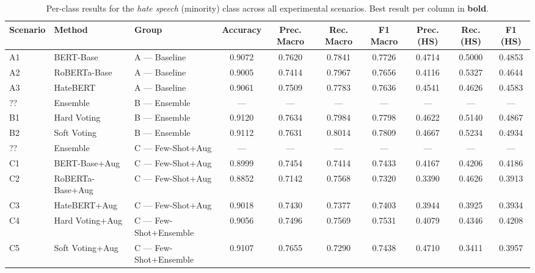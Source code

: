 \begin{table}[htbp]
\centering
\caption{Per-class results for the \emph{hate speech} (minority) class across all experimental scenarios. Best result per column in \textbf{bold}.}
\label{tab:hatespeech_results}
\small
\setlength{\tabcolsep}{4pt}
\renewcommand{\arraystretch}{1.2}
\begin{tabular}{lllccccccc}
\toprule
\textbf{Scenario} & \textbf{Method} & \textbf{Group} & \textbf{Accuracy} & \textbf{Prec. Macro} & \textbf{Rec. Macro} & \textbf{F1 Macro} & \textbf{Prec. (HS)} & \textbf{Rec. (HS)} & \textbf{F1 (HS)} \\
\midrule
A1 & BERT-Base & A — Baseline & 0.9072 & 0.7620 & 0.7841 & 0.7726 & 0.4714 & 0.5000 & 0.4853 \\
A2 & RoBERTa-Base & A — Baseline & 0.9005 & 0.7414 & 0.7967 & 0.7656 & 0.4116 & 0.5327 & 0.4644 \\
A3 & HateBERT & A — Baseline & 0.9061 & 0.7509 & 0.7783 & 0.7636 & 0.4541 & 0.4626 & 0.4583 \\
\midrule
?? & Ensemble & B — Ensemble & — & — & — & — & — & — & — \\
B1 & Hard Voting & B — Ensemble & 0.9120 & 0.7634 & 0.7984 & 0.7798 & 0.4622 & 0.5140 & 0.4867 \\
B2 & Soft Voting & B — Ensemble & 0.9112 & 0.7631 & 0.8014 & 0.7809 & 0.4667 & 0.5234 & 0.4934 \\
\midrule
?? & Ensemble & C — Few-Shot+Aug & — & — & — & — & — & — & — \\
C1 & BERT-Base+Aug & C — Few-Shot+Aug & 0.8999 & 0.7454 & 0.7414 & 0.7433 & 0.4167 & 0.4206 & 0.4186 \\
C2 & RoBERTa-Base+Aug & C — Few-Shot+Aug & 0.8852 & 0.7142 & 0.7568 & 0.7320 & 0.3390 & 0.4626 & 0.3913 \\
C3 & HateBERT+Aug & C — Few-Shot+Aug & 0.9018 & 0.7430 & 0.7377 & 0.7403 & 0.3944 & 0.3925 & 0.3934 \\
\midrule
C4 & Hard Voting+Aug & C — Few-Shot+Ensemble & 0.9056 & 0.7496 & 0.7569 & 0.7531 & 0.4079 & 0.4346 & 0.4208 \\
C5 & Soft Voting+Aug & C — Few-Shot+Ensemble & 0.9107 & 0.7655 & 0.7290 & 0.7438 & 0.4710 & 0.3411 & 0.3957 \\
\bottomrule
\end{tabular}
\end{table}